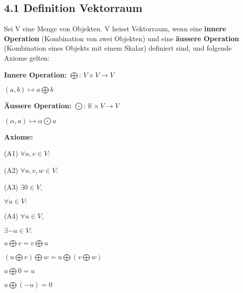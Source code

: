 \subsection{4.1 Definition Vektorraum}{
\vskip1pt
Sei V eine Menge von Objekten. V heisst Vektorraum, wenn eine \textbf{innere Operation} (Kombination von zwei Objekten) und eine \textbf{äussere Operation} (Kombination eines Objekts mit einem Skalar) definiert sind, und folgende Axiome gelten:

\vskip3pt
\hskip6pt
\begin{minipage}[c]{0.35 \columnwidth}
\textbf{Innere Operation:}
\vskip1pt
$\bigoplus$: \hskip2pt $V \times V \rightarrow V$ \par
\hskip15pt $(a, b) \mapsto a \bigoplus b$
\end{minipage}
\hskip30pt
\begin{minipage}[c]{0.35 \columnwidth}
\textbf{Äussere Operation:}
\vskip1pt
$\bigodot$: \hskip2pt $\mathbb{K} \times V \rightarrow V$ \par
\hskip15pt $(\alpha, a) \mapsto \alpha \bigodot a$
\end{minipage}

\vskip3pt
\hskip6pt
\textbf{Axiome:} \vskip2pt \par
\hskip6pt
\begin{minipage}[t]{0.36 \columnwidth}
\parskip8pt
(A1) $\forall u, v \in V:$ \par
(A2) $\forall u, v, w \in V:$ \par
(A3) $\exists 0 \in V,$ \par \vspace{-4pt}
\hskip17pt $\forall u \in V:$ \par
(A4) $\forall u \in V,$ \par \vspace{-4pt}
\hskip17pt $\exists -u \in V:$
\end{minipage}
\begin{minipage}[t]{0.6 \columnwidth}
\parskip8pt
$u \bigoplus v = v \bigoplus u$ \par
$(u \bigoplus v) \bigoplus w = u \bigoplus (v \bigoplus w)$ \par
$u \bigoplus 0 = u$ \par \vskip12pt
$u \bigoplus (-u) = 0$
\end{minipage}

}

